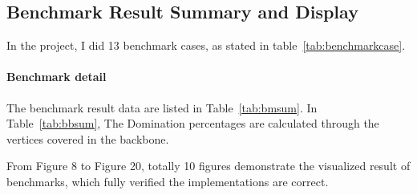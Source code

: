 \documentclass[prodmode,acmtecs]{acmsmall} %
\begin{document}
\subsection{Benchmark Result Summary and Display}
In the project, I did 13 benchmark cases, as stated in table~\ref{tab:benchmarkcase}.
\begin{table}
\end{table}
\paragraph{Benchmark detail} 
The benchmark result data are listed in Table~\ref{tab:bmsum}. In Table~\ref{tab:bbsum}, The Domination percentages are calculated through the vertices covered in the backbone.

From Figure 8 to Figure 20, totally 10 figures demonstrate the visualized result of benchmarks, which fully verified the implementations are correct.
\end{document}
